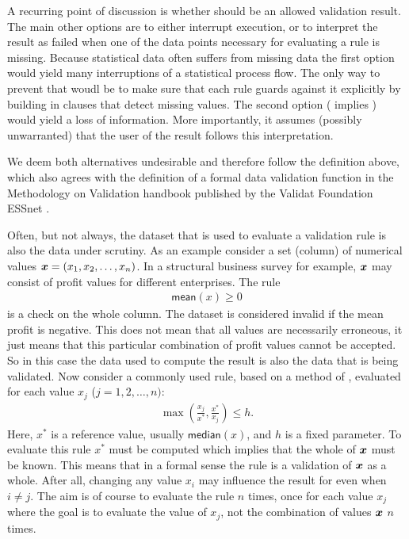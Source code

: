 A recurring point of discussion is whether \na{} should be an allowed
validation result. The main other options are to either interrupt execution, or
to interpret the result as failed when one of the data points necessary for
evaluating a rule is missing. Because statistical data often suffers from
missing data the first option would yield many interruptions of a statistical
process flow. The only way to prevent that woudl be to make sure that each rule
guards against it explicitly by building in clauses that detect missing values.
The second option (\na{} implies \onwaar{}) would yield a loss of information.
More importantly, it assumes (possibly unwarranted) that the user of the result
follows this interpretation.

We deem both alternatives undesirable and therefore follow the definition
above, which also agrees with the definition of a formal data validation
function in the Methodology on Validation handbook published by the Validat
Foundation ESSnet \citep{zio2015methodology}.

Often, but not always, the dataset that is used to evaluate a validation rule
is also the data under scrutiny. As an example consider a set (column) of
numerical values $\boldsymbol{x}=(x_1,x_2,\ldots,x_n)$. In a structural business survey
for example, $\boldsymbol{x}$ may consist of profit values for different enterprises.
The rule 
\begin{align*}
\textsf{mean}(x) \geq 0
\end{align*}
is a check on the whole column. The dataset is considered invalid if the mean
profit is negative. This does not mean that all values are necessarily
erroneous, it just means that this particular combination of profit values
cannot be accepted. So in this case the data used to compute the result is also
the data that is being validated. Now consider a commonly used rule, based on a
method of \citet{hiridoglou1986statistical}, evaluated for each value $x_j$
($j=1,2,\ldots, n)$:
\begin{align}
\max\left(\frac{x_j}{x^*},\frac{x^*}{x_j}\right) \leq h.
\label{eq:hbfun}
\end{align}
Here, $x^*$ is a reference value, usually $\textsf{median}(x)$, and $h$ is a
fixed parameter. To evaluate this rule $x^*$ must be computed which implies
that the whole of $\boldsymbol{x}$ must be known. This means that in a formal sense the
rule is a validation of $\boldsymbol{x}$ as a whole. After all, changing any value
$x_{i}$ may influence the result for even when $i\not=j$. The aim is of course
to evaluate the rule $n$ times, once for each value $x_j$ where the goal is to
evaluate the value of $x_j$, not the combination of values $\boldsymbol{x}$ $n$ times.

